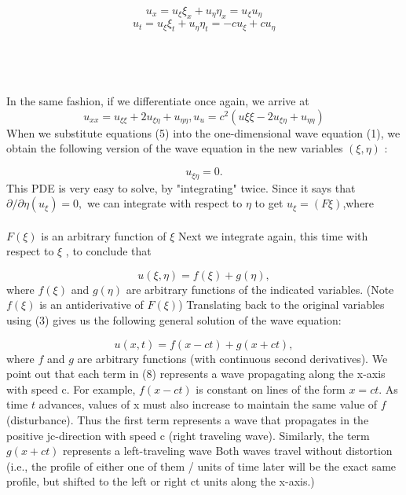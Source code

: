 \documentclass[../main.tex]{subfiles}
\begin{document}
$$u_x = u_\xi \xi_x + u_\eta \eta_x = u_\xi u_\eta$$
\begin{equation}
u_t =u_\xi \xi_t +u_\eta \eta_t =-cu_\xi+cu_\eta
\end{equation}
\\
\\
\\
\\
In the same fashion, if we differentiate once again, we arrive at
\begin{equation}
u_{xx} =u_{\xi \xi}+2u_{\xi \eta}+u_{\eta \eta} , u_u = c^2(u{\xi \xi}-2u_{\xi \eta}+ u_{\eta \eta})  
\end{equation}
When we substitute equations (5) into the one-dimensional wave equation (1), we
obtain the following version of the wave equation in the new variables $(\xi ,\eta)$ : 

\begin{equation}
u_{\xi \eta}=0.
\end{equation}
This PDE is very easy to solve, by "integrating" twice. Since it says that $\partial /\partial \eta(u_\xi)=0,$ we can integrate with respect to $\eta$ to get $u_\xi=(F\xi)$,where
\\
\\
$F(\xi)$  is an arbitrary function of $\xi$ Next we integrate again, this time with respect
to $\xi$ , to conclude that

\begin{equation}
u(\xi,\eta)=f(\xi)+g(\eta),
\end{equation}
where $f(\xi)$ and $g(\eta)$ are arbitrary functions of the indicated variables. (Note  $f(\xi)$ is an antiderivative of $F(\xi)$) Translating back to the original variables
using (3) gives us the following general solution of the wave equation:

\begin{equation}
u(x,t)=f(x-ct)+g(x + ct),
\end{equation}
where $f$ and $g$ are arbitrary functions (with continuous second derivatives). We
point out that each term in (8) represents a wave propagating along the x-axis with
speed c. For example,  $f(x-ct)$  is constant on lines of the form $x = ct$. As time $t$
advances, values of x must also increase to maintain the same value of $f$ (disturbance). Thus the first term represents a wave that propagates in the positive
jc-direction with speed c (right traveling wave). Similarly, the term
$g(x + ct)$ represents a left-traveling wave Both waves travel without distortion
(i.e., the profile of either one of them / units of time later will be the exact same
profile, but shifted to the left or right ct units along the x-axis.)
\end{document}
